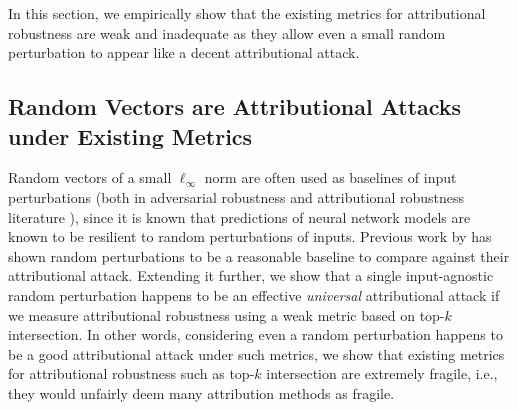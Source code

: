 \documentclass[letterpaper]{article} %
\begin{document}

In this section, we empirically show that the existing metrics for attributional robustness are weak and inadequate as they allow even a small random perturbation to appear like a decent attributional attack.

\subsection{Random Vectors are Attributional Attacks under Existing Metrics}
\label{app:subsec:rand-vec}
Random vectors of a small $\ell_{\infty}$ norm are often used as baselines of input perturbations (both in adversarial robustness \citep{silva2020advrobustsurvey} and attributional robustness literature \cite{ghorbani2018interpretation}), since it is known that predictions of neural network models are known to be resilient to random perturbations of inputs. 
Previous work by \citet{ghorbani2018interpretation} has shown random perturbations to be a reasonable baseline to compare against their attributional attack. Extending it further, we show that a single input-agnostic random perturbation happens to be an effective \emph{universal} attributional attack if we measure attributional robustness using a weak metric based on top-$k$ intersection. In other words, considering even a random perturbation happens to be a good attributional attack under such metrics, we show that existing metrics for attributional robustness such as top-$k$ intersection are extremely fragile, i.e., they would unfairly deem many attribution methods as fragile. 
\end{document}
